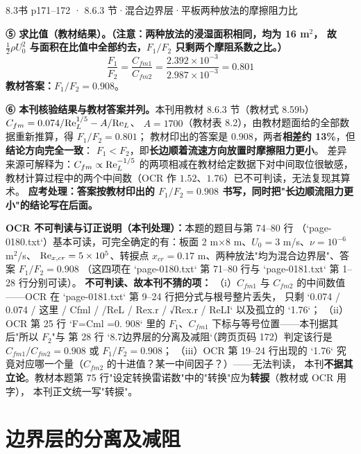 \begin{liti}{8.3}{书 p171--172 · 8.6.3 节·混合边界层·平板两种放法的摩擦阻力比}
\begin{jie}
\textbf{⑤ 求比值（教材结果）。（注意：两种放法的浸湿面积相同，均为 16 m$^2$，
故 $\frac12\rho U_0^2$ 与面积在比值中全部约去，$F_1/F_2$ 只剩两个摩阻系数之比。）}
\[ \frac{F_1}{F_2}=\frac{C_{fm1}}{C_{fm2}}=\frac{2.392\times10^{-3}}{2.987\times10^{-3}}=0.801 \]
\textbf{教材答案：}$F_1/F_2=0.908$。

\textbf{⑥ 本刊核验结果与教材答案并列。}本刊用教材 8.6.3 节（教材式 8.59b）$C_{fm}=0.074/\mathrm{Re}_L^{1/5}-A/\mathrm{Re}_L$、
$A=1700$（教材表 8.2），由教材题面给的全部数据重新推算，得 $F_1/F_2=0.801$；
教材印出的答案是 $0.908$，两者\textbf{相差约 13\%}，但\textbf{结论方向完全一致}：
$F_1<F_2$，即\textbf{长边顺着流速方向放置时摩擦阻力更小}。
差异来源可解释为：$C_{fm}\propto\mathrm{Re}_L^{-1/5}$ 的两项相减在教材给定数据下对中间取位很敏感，
教材计算过程中的两个中间数（OCR 作 $1.52$、$1.76$）已不可判读，无法复现其算术。
\textbf{应考处理：答案按教材印出的 $F_1/F_2=0.908$ 书写，同时把"长边顺流阻力更小"的结论写在后面。}
\end{jie}

\begin{tishi}
\textbf{OCR 不可判读与订正说明（本刊处理）：}本题的题目与第 74--80 行
（`page-0180.txt`）基本可读，可完全确定的有：板面 2 m$\times$8 m、$U_0=3$ m/s、$\nu=10^{-6}$ m$^2$/s、
$\mathrm{Re}_{x,cr}=5\times10^{5}$、转捩点 $x_{cr}=0.17$ m、两种放法"均为混合边界层"、答案 $F_1/F_2=0.908$
（这四项在 `page-0180.txt` 第 71--80 行与 `page-0181.txt` 第 1--28 行分别可读）。
\textbf{不可判读、故本刊不猜的项：}
（i）$C_{fm1}$ 与 $C_{fm2}$ 的中间数值——OCR 在 `page-0181.txt` 第 9--24 行把分式与根号整片丢失，
只剩 `0.074 / 0.074 / 这里 / Cfml / /ReL / Rex.r / √Rex.r / ReLI` 以及孤立的 `1.76`；
（ii）OCR 第 25 行 `F=Cml =0. 908` 里的 $F_1$、$C_{fm1}$ 下标与等号位置——本刊据其后"所以 $F_2$"与
第 28 行 `8.7边界层的分离及减阻`（跨页页码 172）判定该行是 $C_{fm1}/C_{fm2}=0.908$ 或 $F_1/F_2=0.908$；
（iii）OCR 第 19--24 行出现的 `1.76` 究竟对应哪一个量（$C_{fm2}$ 的十进值？某一中间因子？）——无法判读，
本刊\textbf{不据其立论}。教材本题第 75 行"设定转换雷诺数"中的"转换"应为\textbf{转捩}（教材或 OCR 用字），
本刊正文统一写"转捩"。
\end{tishi}
\end{liti}

\section{边界层的分离及减阻}

